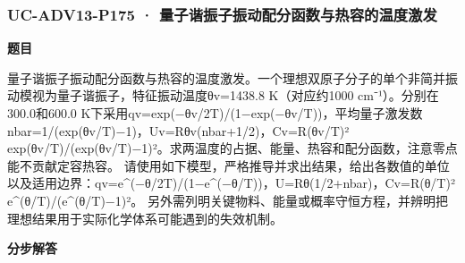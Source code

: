 \documentclass[UTF8,11pt,a4paper]{ctexart}
\begin{document}
\subsubsection*{UC-ADV13-P175 · 量子谐振子振动配分函数与热容的温度激发}
\noindent\textbf{题目}\par
量子谐振子振动配分函数与热容的温度激发。一个理想双原子分子的单个非简并振动模视为量子谐振子，特征振动温度θv=1438.8 K（对应约1000 cm⁻¹）。分别在300.0和600.0 K下采用qv=exp(−θv/2T)/(1−exp(−θv/T))，平均量子激发数nbar=1/(exp(θv/T)−1)，Uv=Rθv(nbar+1/2)，Cv=R(θv/T)² exp(θv/T)/(exp(θv/T)−1)²。求两温度的占据、能量、热容和配分函数，注意零点能不贡献定容热容。 请使用如下模型，严格推导并求出结果，给出各数值的单位以及适用边界：qv=e\textasciicircum{}(−θ/2T)/(1−e\textasciicircum{}(−θ/T))，U=Rθ(1/2+nbar)，Cv=R(θ/T)² e\textasciicircum{}(θ/T)/(e\textasciicircum{}(θ/T)−1)²。 另外需列明关键物料、能量或概率守恒方程，并辨明把理想结果用于实际化学体系可能遇到的失效机制。\par
\medskip\noindent\textbf{分步解答}
\end{document}
